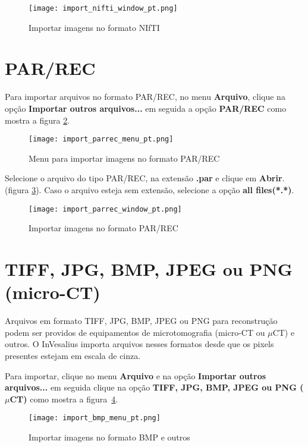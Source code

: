 \begin{figure}[!htb]
\centering
\texttt{[image: import\_nifti\_window\_pt.png]}
\caption{Importar imagens no formato NIfTI}
\label{fig:import_nifti_window_pt}
\end{figure}

\section{PAR/REC}


Para importar arquivos no formato PAR/REC, no menu \textbf{Arquivo}, clique na opção \textbf{Importar outros arquivos...} em seguida a opção \textbf{PAR/REC} como mostra a figura \ref{fig:import_parrec_menu_pt}.

\begin{figure}[!htb]
\centering
\texttt{[image: import\_parrec\_menu\_pt.png]}
\caption{Menu para importar imagens no formato PAR/REC}
\label{fig:import_parrec_menu_pt}
\end{figure}

Selecione o arquivo do tipo PAR/REC, na extensão \textbf{.par} e clique em \textbf{Abrir}. (figura \ref{fig:import_parrec_window_pt}). Caso o arquivo esteja sem extensão, selecione a opção \textbf{all files(*.*)}.

\begin{figure}[!htb]
\centering
\texttt{[image: import\_parrec\_window\_pt.png]}
\caption{Importar imagens no formato PAR/REC}
\label{fig:import_parrec_window_pt}
\end{figure}



\section{TIFF, JPG, BMP, JPEG ou PNG (micro-CT)}

Arquivos em formato TIFF, JPG, BMP, JPEG ou PNG para reconstrução podem ser providos de equipamentos de microtomografia (micro-CT ou $\mu$CT) e outros. O InVesalius importa arquivos nesses formatos desde que os pixels presentes estejam em escala de cinza.

Para importar, clique no menu \textbf{Arquivo} e na opção \textbf{Importar outros arquivos...} em seguida clique na opção \textbf{TIFF, JPG, BMP, JPEG ou PNG ($\mu$CT)} como mostra a figura~\ref{fig:import_bmp_menu_pt}. 

\begin{figure}[!htb]
\centering
\texttt{[image: import\_bmp\_menu\_pt.png]}
\caption{Importar imagens no formato BMP e outros}
\label{fig:import_bmp_menu_pt}
\end{figure}

